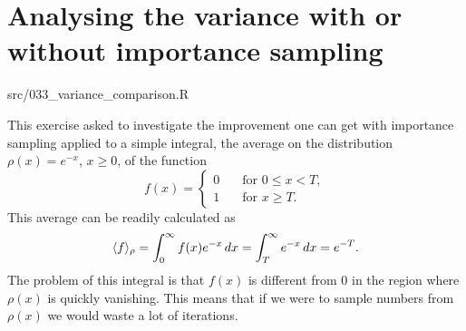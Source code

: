 \section{Analysing the variance with or without importance sampling}%
\label{ex:033}

\begin{sourcefiles}
  \item[Analysis script] src/033\_variance\_comparison.R
\end{sourcefiles}

This exercise asked to investigate the improvement one can get with importance
sampling applied to a simple integral, the average on the distribution $\rho(x)
= e^{-x}$, $x \geq 0$, of the function
\begin{equation}
  f(x) =
  \begin{cases}
    0 &\quad \text{for } 0 \leq x < T, \\
    1 &\quad \text{for } x \geq T.
  \end{cases}
\end{equation}
This average can be readily calculated as
\begin{equation}
  \langle f\rangle_{\rho} = \int_{0}^{\infty} f(x) e^{-x} \, dx = \int_{T}^{\infty}
  e^{-x}\, dx = e^{-T}.
\end{equation}
The problem of this integral is that $f(x)$ is different from $0$ in the region
where $\rho(x)$ is quickly vanishing. This means that if we were to sample
numbers from $\rho(x)$ we would waste a lot of iterations.

